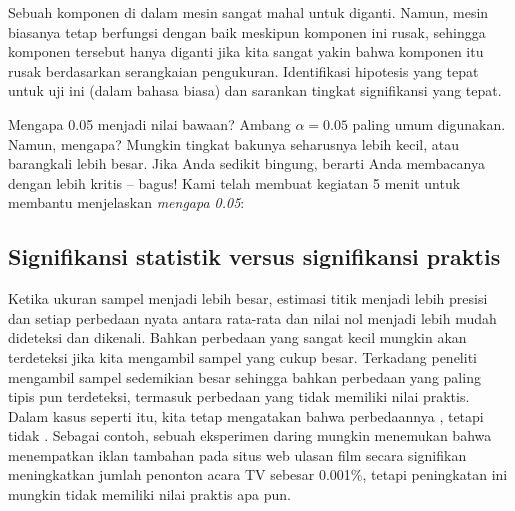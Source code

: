 \begin{exercisewrap}
\begin{nexercise}
Sebuah komponen di dalam mesin sangat mahal untuk diganti.
Namun, mesin biasanya tetap berfungsi dengan baik meskipun
komponen ini rusak, sehingga komponen tersebut hanya diganti jika kita
sangat yakin bahwa komponen itu rusak berdasarkan serangkaian
pengukuran.
Identifikasi hipotesis yang tepat untuk uji ini
(dalam bahasa biasa) dan sarankan tingkat signifikansi
yang tepat.\footnotemark
\end{nexercise}
\end{exercisewrap}

\begin{onebox}{Mengapa 0.05 menjadi nilai bawaan?}
  Ambang $\alpha = 0.05$ paling umum digunakan. Namun, mengapa?
  Mungkin tingkat bakunya seharusnya lebih kecil, atau barangkali lebih besar.
  Jika Anda sedikit bingung, berarti Anda membacanya dengan
  lebih kritis -- bagus!
  Kami telah membuat kegiatan 5 menit untuk membantu menjelaskan \emph{mengapa 0.05}:
  \begin{center}
  \end{center}
\end{onebox}




\subsection{Signifikansi statistik versus signifikansi praktis}

Ketika ukuran sampel menjadi lebih besar,
estimasi titik menjadi lebih presisi dan setiap perbedaan nyata
antara rata-rata dan nilai nol menjadi lebih mudah dideteksi dan dikenali.
Bahkan perbedaan yang sangat kecil mungkin akan terdeteksi jika kita mengambil
sampel yang cukup besar.
Terkadang peneliti mengambil sampel sedemikian besar sehingga bahkan
perbedaan yang paling tipis pun terdeteksi, termasuk perbedaan yang
tidak memiliki nilai praktis.
Dalam kasus seperti itu, kita tetap mengatakan bahwa perbedaannya
,
tetapi tidak .
Sebagai contoh, sebuah eksperimen daring mungkin menemukan bahwa menempatkan
iklan tambahan pada situs web ulasan film secara
signifikan meningkatkan jumlah penonton acara TV sebesar 0.001\%,
tetapi peningkatan ini mungkin tidak memiliki nilai praktis apa pun.

